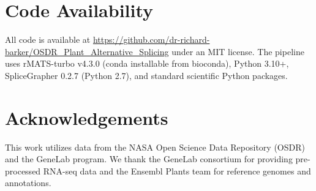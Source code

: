 \documentclass[12pt,a4paper]{article}
\begin{document}
\section{Code Availability}

All code is available at \url{https://github.com/dr-richard-barker/OSDR_Plant_Alternative_Splicing} under an MIT license. The pipeline uses rMATS-turbo v4.3.0 (conda installable from bioconda), Python 3.10+, SpliceGrapher 0.2.7 (Python 2.7), and standard scientific Python packages.

\section{Acknowledgements}

This work utilizes data from the NASA Open Science Data Repository (OSDR) and the GeneLab program. We thank the GeneLab consortium for providing pre-processed RNA-seq data and the Ensembl Plants team for reference genomes and annotations.
\end{document}
